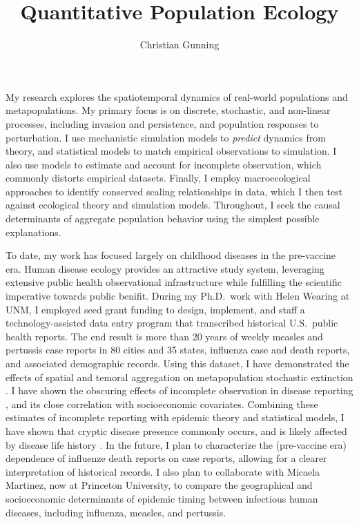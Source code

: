 \documentclass[12pt]{article}
\author{Christian Gunning}
\title{Quantitative Population Ecology}
\begin{document}
\thispagestyle{empty}
\linespread{1.25}\selectfont

My research explores the spatiotemporal dynamics 
of real-world populations and metapopulations. 
My primary focus is on discrete, stochastic, and non-linear processes,
including invasion and persistence, and population responses to perturbation.
I use mechanistic simulation 
models to {\em predict} dynamics from theory, and statistical models 
to match empirical observations to simulation.
I also use models to estimate and account for incomplete 
observation, which commonly distorts empirical datasets.
Finally, I employ macroecological approaches 
to identify conserved scaling relationships in 
data, which I then test against ecological theory and 
simulation models. Throughout, I seek the causal determinants of
aggregate population behavior using the simplest 
possible explanations.


To date, my work has focused largely on childhood diseases in the pre-vaccine
era. Human disease ecology provides an attractive study system, leveraging
extensive public health observational infrastructure while fulfilling the scientific
imperative towards public benifit. During my Ph.D.\ work with Helen Wearing
at UNM, I employed seed grant funding to design, implement, and staff a
technology-assisted data entry program that transcribed historical U.S.\ public
health reports. The end result is more than 20 years of weekly measles and
pertussis case reports in 80 cities and 35 states, influenza
case and death reports, and associated demographic records.  Using this
dataset, I have demonstrated the effects of spatial and temoral aggregation on
metapopulation stochastic extinction \citep{gunning2013probabilistic}.
I have shown the obscuring effects of incomplete observation
in disease reporting \citep{gunning2014conserved}, and its close correlation 
with socioeconomic covariates. Combining these estimates of incomplete reporting
with epidemic theory and statistical models, I have shown that cryptic 
disease presence commonly occurs, and is likely affected by disease life
history \citep{gunning2016cryptic}.  
In the future, I plan to characterize the (pre-vaccine era) dependence of influenze
death reports on case reports, allowing for a clearer interpretation 
of historical records. I also plan to collaborate with 
Micaela Martinez, now at Princeton University, to compare the geographical
and socioeconomic determinants of epidemic timing between 
infectious human diseases, including influenza, measles, and pertussis.
\end{document}
